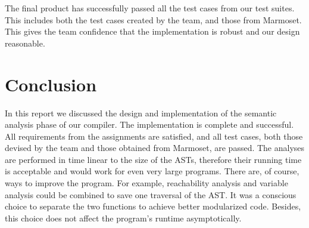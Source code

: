 \documentclass[a4paper, notitlepage]{report}
\begin{document}
The final product has successfully passed all the test cases from our test suites. This includes both the test cases created by the team, and those from Marmoset. This gives the team confidence that the implementation is robust and our design reasonable.

\chapter{Conclusion}
In this report we discussed the design and implementation of the semantic analysis phase of our compiler. The implementation is complete and successful. All requirements from the assignments are satisfied, and all test cases, both those devised by the team and those obtained from Marmoset, are passed. The analyses are performed in time linear to the size of the ASTs, therefore their running time is acceptable and would work for even very large programs. There are, of course, ways to improve the program. For example, reachability analysis and variable analysis could be combined to save one traversal of the AST. It was a conscious choice to separate the two functions to achieve better modularized code. Besides, this choice does not affect the program's runtime asymptotically.




\end{document}
